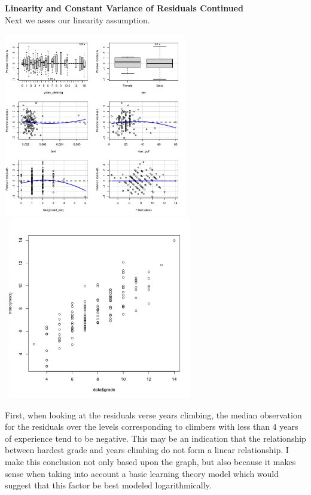 \documentclass[11pt]{amsart}
\begin{document}
\newpage
{\bf Linearity and Constant Variance of Residuals Continued}\\
Next we asses our linearity assumption.\\
\begin{center}
\includegraphics[width=0.6\textwidth]{3.pdf}\\\
\includegraphics[width=0.6\textwidth]{lin}
\end{center}
\vspace{0.15in}
First, when looking at the residuals verse years climbing, the median observation for the residuals over the levels corresponding to climbers with less than $4$ years of experience tend to be negative. This may be an indication that the relationship between hardest grade and years climbing do not form a linear relationship.
I make this conclusion not only based upon the graph, but also because it makes sense when taking into account a basic learning theory model which would suggest that this factor be best modeled logarithmically.\\
\end{document}
